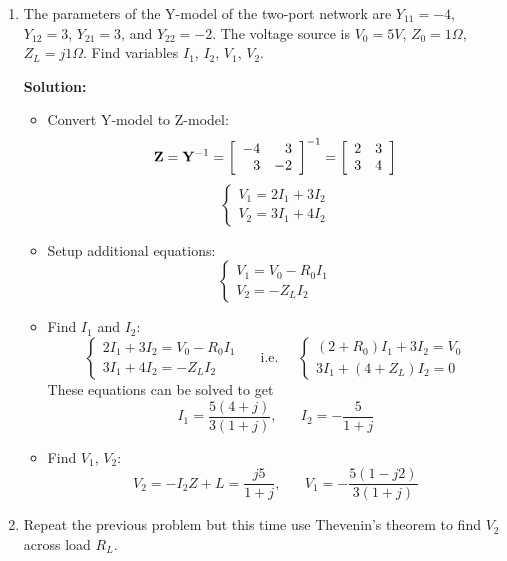 \begin{enumerate}
\item The parameters of the Y-model of the two-port network are
$Y_{11}=-4$, $Y_{12}=3$, $Y_{21}=3$, and $Y_{22}=-2$. The voltage source
is $V_0=5V$, $Z_0=1\Omega$, $Z_L=j1\Omega$. Find variables $I_1$, $I_2$, $V_1$, $V_2$.


 {\bf Solution:} 
 \begin{itemize}
 \item Convert Y-model to Z-model:
   \[ {\bf Z}={\bf Y}^{-1}=\left[ \begin{array}{rr}-4 & 3 \\ 3 & -2\end{array} \right]^{-1}
   =\left[ \begin{array}{rr}2 & 3 \\ 3 & 4\end{array} \right] \]
   \[ \left\{ \begin{array}{l} V_1=2I_1+3I_2 \\ V_2=3I_1+4I_2 \end{array} \right. \]
 \item Setup additional equations:
   \[ \left\{ \begin{array}{l} V_1=V_0-R_0I_1 \\ V_2=-Z_L I_2 \end{array} \right. \]
 \item Find $I_1$ and $I_2$:
   \[ \left\{ \begin{array}{l} 2I_1+3I_2=V_0-R_0I_1\\ 3I_1+4I_2=-Z_LI_2\end{array}\right. 
     \;\;\;\;\;\mbox{i.e.}\;\;\;\;\;
   \left\{ \begin{array}{l} (2+R_0)I_1+3I_2=V_0\\ 3I_1+(4+Z_L)I_2=0\end{array}\right. \]
     These equations can be solved to get
     \[ I_1=\frac{5(4+j)}{3(1+j)},\;\;\;\;\;\;I_2=-\frac{5}{1+j}\]
 \item Find $V_1$, $V_2$:
   \[ V_2=-I_2Z+L=\frac{j5}{1+j},\;\;\;\;\;\; V_1=-\frac{5(1-j2)}{3(1+j)} \]
 \end{itemize}

\item Repeat the previous problem but this time use Thevenin's theorem to find
$V_2$ across load $R_L$.


\end{enumerate}
